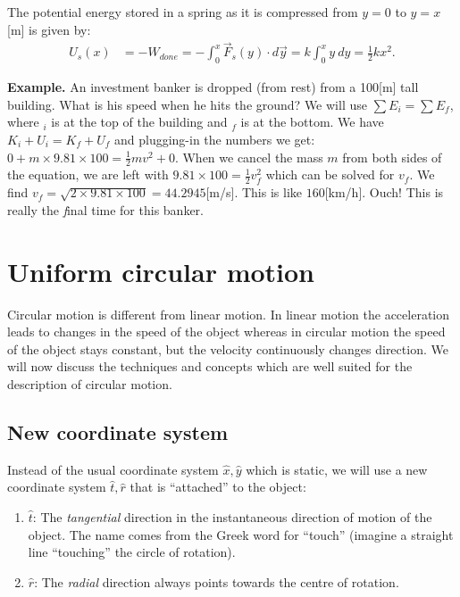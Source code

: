 \documentclass[letterpaper,9pt,journal]{IEEEtran}
\begin{document}
The potential energy stored in a spring as it is
compressed from $y=0$ to $y=x$[m] is given by:
\begin{align}
 U_s(x) &= -W_{done} = -\!\int_0^x \!\vec{F}_{s}(y) \cdot d\vec{y} = k\!\int_0^x \!\! y\: dy  = \frac{1}{2}kx^2.
  \label{SPRINGpotENERGY}
\end{align}


{\bf Example.}
An investment banker is dropped (from rest) from a 100[m] tall building.
What is his speed when he hits the ground?
We will use $\sum E_i  =  \sum E_f$, where $_i$ is at the top of the building
and $_f$ is at the bottom. We have $K_i + U_i   =    K_f + U_f$ and
plugging-in the numbers we get: $ 0      +  m \times9.81 \times100  =    \frac{1}{2}mv^2   + 0$.
When we cancel the mass $m$ from both sides of the equation, 
we are left with $9.81\times 100  =    \frac{1}{2}v_f^2$
which can be solved for $v_f$. 
We find $v_f =\sqrt{ 2\times 9.81\times 100}=44.2945$[m/s].
This is like $160$[km/h]. Ouch! This is really the \emph{f}inal time for this banker.









\section{Uniform circular motion}
\label{sec:uniform-circular-motion}

Circular motion is different from linear motion. 
In linear motion the acceleration leads to changes in the speed of the object
whereas in circular motion the speed of the object stays constant, 
but the velocity continuously changes direction.
We will now discuss the techniques and concepts which are well suited
for the description of circular motion.

\vspace{-3mm}
\subsection{New coordinate system}

Instead of the usual coordinate system $\hat{x},\hat{y}$ which is static, 
we will use a new coordinate system $\hat{t},\hat{r}$ that is ``attached'' to the object:
\begin{enumerate}
\item  $\hat{t}$: 
	The \emph{tangential} direction in the instantaneous direction of motion of the object. 
	The name comes from the Greek word for ``touch'' (imagine a straight line ``touching'' the circle of rotation).
\item  $\hat{r}$: 
	The \emph{radial} direction always points towards the centre of rotation.
\end{enumerate}
%
\end{document}
